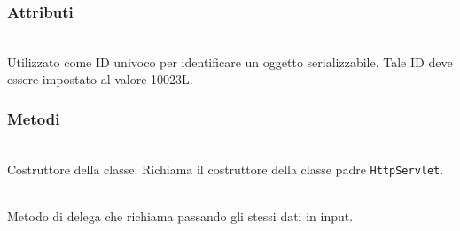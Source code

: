\subsubsection*{Attributi}
\begin{description}
  \item{}\\
  Utilizzato come ID univoco per identificare un oggetto serializzabile. Tale ID deve essere impostato al valore 10023L.
\end{description}

\subsubsection*{Metodi}
\begin{description}
	\item{}\\
	Costruttore della classe. Richiama il costruttore della classe padre \texttt{HttpServlet}.
	
	\item{}\\
	Metodo di delega che richiama  passando gli stessi dati in input.
	

\end{description}
